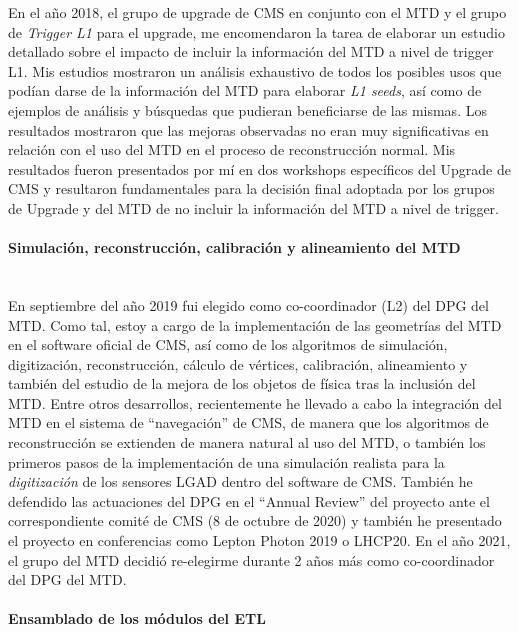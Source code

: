 En el año 2018, el grupo de upgrade de CMS en conjunto con el MTD y el grupo de \emph{Trigger L1} para el upgrade, me encomendaron la tarea de elaborar un estudio detallado sobre el impacto de incluir la información del MTD a nivel de trigger L1. Mis estudios mostraron un análisis exhaustivo de todos los posibles usos que podían darse de la información del MTD para elaborar \emph{L1 seeds}, así como de ejemplos de análisis y búsquedas que pudieran beneficiarse de las mismas. Los resultados mostraron que las mejoras observadas no eran muy significativas en relación con el uso del MTD en el proceso de reconstrucción normal. Mis resultados fueron presentados por mí en dos workshops específicos del Upgrade de CMS y resultaron fundamentales para la decisión final adoptada por los grupos de Upgrade y del MTD de no incluir la información del MTD a nivel de trigger.     

\paragraph{Simulación, reconstrucción, calibración y alineamiento del MTD\\\\}

En septiembre del año 2019 fui elegido como co-coordinador (L2) del DPG del MTD. Como tal, estoy a cargo de la implementación de las geometrías del MTD en el software oficial de CMS, así como de los algoritmos de simulación, digitización, reconstrucción, cálculo de vértices, calibración, alineamiento y también del estudio de la mejora de los objetos de física tras la inclusión del MTD. Entre otros desarrollos, recientemente he llevado a cabo la integración del MTD en el sistema de “navegación” de CMS, de manera que los algoritmos de
reconstrucción se extienden de manera natural al uso del MTD, o también los primeros pasos de la implementación de una simulación realista para la \emph{digitización} de los sensores LGAD dentro del software de CMS. También he defendido las actuaciones del DPG en el “Annual Review” del proyecto ante el correspondiente comité de CMS (8 de octubre de 2020) y también he presentado el proyecto en conferencias como Lepton Photon 2019 o LHCP20. En el año 2021, el grupo del MTD decidió re-elegirme durante 2 años más como co-coordinador del DPG del MTD.

\paragraph{Ensamblado de los módulos del ETL\\\\}

